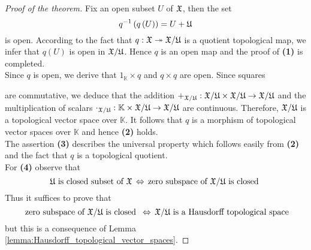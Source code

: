 \begin{proof}[Proof of the theorem]
Fix an open subset $U$ of ${\mathfrak X}$, then the set 
$$q^{-1}\left(q\left(U\right)\right) = U + {\mathfrak U}$$
is open. According to the fact that $q:{\mathfrak X}\twoheadrightarrow {\mathfrak X}/{\mathfrak U}$ is a quotient topological map, we infer that $q(U)$ is open in ${\mathfrak X}/{\mathfrak U}$. Hence $q$ is an open map and the proof of \textbf{(1)} is completed.\\
Since $q$ is open, we derive that $1_{\mathbb{K}}\times q$ and $q\times q$ are open. Since squares
\begin{center}
\end{center}
are commutative, we deduce that the addition $+_{{\mathfrak X}/{\mathfrak U}}:{\mathfrak X}/{\mathfrak U} \times {\mathfrak X}/{\mathfrak U} \rightarrow {\mathfrak X}/{\mathfrak U}$ and the multiplication of scalars $\cdot_{{\mathfrak X}/{\mathfrak U}}:\mathbb{K}\times {\mathfrak X}/{\mathfrak U}\rightarrow {\mathfrak X}/{\mathfrak U}$ are continuous. Therefore, ${\mathfrak X}/{\mathfrak U}$ is a topological vector space over $\mathbb{K}$. It follows that $q$ is a morphism of topological vector spaces over $\mathbb{K}$ and hence \textbf{(2)} holds.\\
The assertion \textbf{(3)} describes the universal property which follows easily from \textbf{(2)} and the fact that $q$ is a topological quotient.\\
For \textbf{(4)} observe that
$${\mathfrak U}\mbox{ is closed subset of }{\mathfrak X}\,\Leftrightarrow\,\mbox{zero subspace of }{\mathfrak X}/{\mathfrak U}\mbox{ is closed }$$
Thus it suffices to prove that
$$\mbox{ zero subspace of }{\mathfrak X}/{\mathfrak U}\mbox{ is closed }\,\Leftrightarrow\,{\mathfrak X}/{\mathfrak U}\mbox{ is a Hausdorff topological space}$$
but this is a consequence of Lemma \ref{lemma:Hausdorff_topological_vector_spaces}.    
\end{proof}

